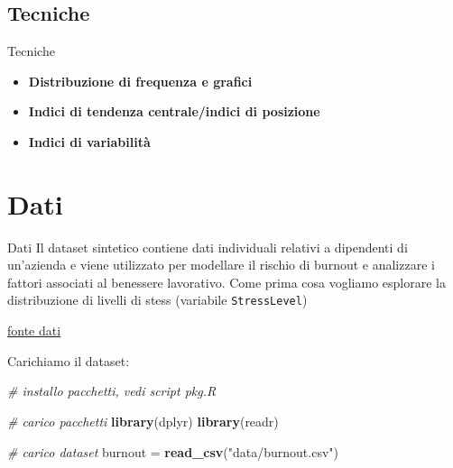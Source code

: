 \documentclass[
  ignorenonframetext,
  compress, aspectratio=149]{beamer}
\newenvironment{Shaded}{\begin{snugshade}}{\end{snugshade}}
\newcommand{\CommentTok}[1]{\textcolor[rgb]{0.56,0.35,0.01}{\textit{#1}}}
\newcommand{\FunctionTok}[1]{\textcolor[rgb]{0.13,0.29,0.53}{\textbf{#1}}}
\newcommand{\NormalTok}[1]{#1}
\newcommand{\OtherTok}[1]{\textcolor[rgb]{0.56,0.35,0.01}{#1}}
\newcommand{\StringTok}[1]{\textcolor[rgb]{0.31,0.60,0.02}{#1}}
\begin{document}
\subsection{Tecniche}\label{tecniche}

\begin{frame}{Tecniche}
\begin{itemize}
\item
  \textbf{Distribuzione di frequenza e grafici}
\item
  \textbf{Indici di tendenza centrale/indici di posizione}
\item
  \textbf{Indici di variabilità}
\end{itemize}
\end{frame}

\section{Dati}\label{dati}

\begin{frame}[fragile]{Dati}
Il dataset sintetico contiene dati individuali relativi a dipendenti di
un'azienda e viene utilizzato per modellare il rischio di burnout e
analizzare i fattori associati al benessere lavorativo. Come prima cosa
vogliamo esplorare la distribuzione di livelli di stess (variabile
\texttt{StressLevel})

\href{https://www.kaggle.com/datasets/ankam6010/synthetic-hr-burnout-dataset/data}{fonte
dati}
\end{frame}

\begin{frame}[fragile]
Carichiamo il dataset:

\begin{Shaded}
\begin{Highlighting}[]
\CommentTok{\# installo pacchetti, vedi script pkg.R}

\CommentTok{\# carico pacchetti}
\FunctionTok{library}\NormalTok{(dplyr)}
\FunctionTok{library}\NormalTok{(readr)}

\CommentTok{\# carico dataset}
\NormalTok{burnout }\OtherTok{=} \FunctionTok{read\_csv}\NormalTok{(}\StringTok{"data/burnout.csv"}\NormalTok{)}
\end{Highlighting}
\end{Shaded}
\end{frame}
\end{document}
